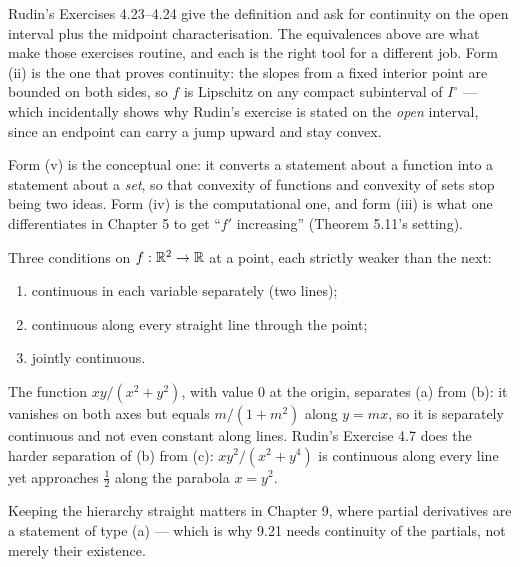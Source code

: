 \begin{deeper}
Rudin's Exercises 4.23--4.24 give the definition and ask for continuity on
the open interval plus the midpoint characterisation. The equivalences above
are what make those exercises routine, and each is the right tool for a
different job. Form (ii) is the one that proves continuity: the slopes from
a fixed interior point are bounded on both sides, so $f$ is Lipschitz on any
compact subinterval of $I^\circ$ --- which incidentally shows why Rudin's
exercise is stated on the \emph{open} interval, since an endpoint can carry
a jump upward and stay convex.

Form (v) is the conceptual one: it converts a statement about a function
into a statement about a \emph{set}, so that convexity of functions and
convexity of sets stop being two ideas. Form (iv) is the computational one,
and form (iii) is what one differentiates in Chapter 5 to get ``$f'$
increasing'' (Theorem 5.11's setting).
\end{deeper}

\begin{pitfall}
Three conditions on $f : \mathbb{R}^2 \to \mathbb{R}$ at a point, each strictly weaker than
the next:
\begin{enumerate}[label=(\alph*), leftmargin=2.2em, itemsep=1pt, topsep=3pt]
  \item continuous in each variable separately (two lines);
  \item continuous along every straight line through the point;
  \item jointly continuous.
\end{enumerate}
The function $xy/(x^2+y^2)$, with value $0$ at the origin, separates (a)
from (b): it vanishes on both axes but equals $m/(1+m^2)$ along $y=mx$, so
it is separately continuous and not even constant along lines. Rudin's
Exercise 4.7 does the harder separation of (b) from (c): $xy^2/(x^2+y^4)$ is
continuous along every line yet approaches $\tfrac12$ along the parabola
$x=y^2$.

Keeping the hierarchy straight matters in Chapter 9, where partial
derivatives are a statement of type (a) --- which is why 9.21 needs
continuity of the partials, not merely their existence.
\end{pitfall}

